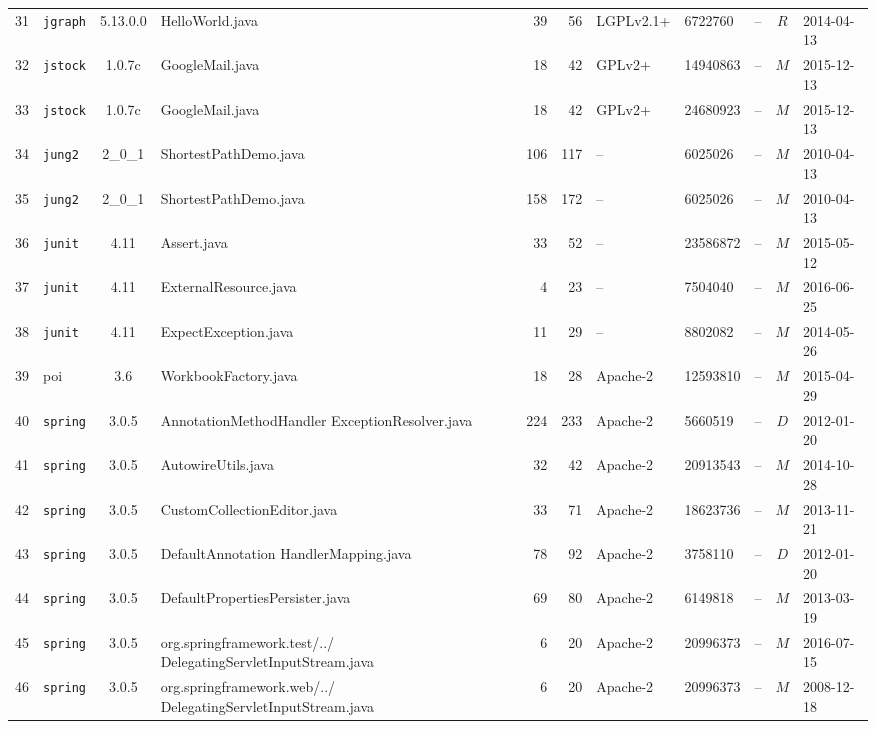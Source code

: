 \documentclass{sig-alternate-05-2015}
\begin{document}
\begin{table}
{\begin{tabular}{r|l|c|p{4.5cm}|r|r|l|l|l|c|l}
			31 & \texttt{jgraph} & 5.13.0.0 & HelloWorld.java  & 39 & 56 & LGPLv2.1+ & 6722760 & -- & $R$  & 2014-04-13 \\
			32 & \texttt{jstock} & 1.0.7c & GoogleMail.java  & 18 & 42 & GPLv2+ & 14940863 & -- & $M$  & 2015-12-13 \\
			33 & \texttt{jstock} & 1.0.7c & GoogleMail.java  & 18 & 42 & GPLv2+ & 24680923 & -- & $M$  & 2015-12-13 \\
			34 & \texttt{jung2} & 2\_0\_1  & ShortestPathDemo.java  & 106 & 117 & -- & 6025026 & -- & $M$  & 2010-04-13 \\
			35 & \texttt{jung2} & 2\_0\_1  & ShortestPathDemo.java  & 158 & 172 & -- & 6025026 & -- & $M$  & 2010-04-13 \\
			36 & \texttt{junit} & 4.11 & Assert.java  & 33 & 52 & -- & 23586872 & -- & $M$  & 2015-05-12 \\
			37 & \texttt{junit} & 4.11 & ExternalResource.java  & 4 & 23 & -- & 7504040 & -- & $M$  & 2016-06-25 \\
			38 & \texttt{junit} & 4.11 & ExpectException.java  & 11 & 29 & -- & 8802082 & -- & $M$  & 2014-05-26 \\
			39 & poi & 3.6 & WorkbookFactory.java  & 18 & 28 & Apache-2 & 12593810 & -- & $M$  & 2015-04-29 \\
			40 & \texttt{spring} & 3.0.5 & AnnotationMethodHandler \newline ExceptionResolver.java  & 224 & 233 & Apache-2 & 5660519 & -- & $D$  & 2012-01-20 \\
			41 & \texttt{spring} & 3.0.5  & AutowireUtils.java  & 32 & 42 & Apache-2 & 20913543 & -- & $M$  & 2014-10-28 \\
			42 & \texttt{spring} & 3.0.5  & CustomCollectionEditor.java  & 33 & 71 & Apache-2 & 18623736 & -- & $M$  & 2013-11-21 \\
			43 & \texttt{spring} & 3.0.5  & DefaultAnnotation \newline HandlerMapping.java  & 78 & 92 & Apache-2 & 3758110 & -- & $D$  & 2012-01-20 \\
			44 & \texttt{spring} & 3.0.5  & DefaultPropertiesPersister.java  & 69 & 80 & Apache-2 & 6149818 & -- & $M$  & 2013-03-19 \\
			45 & \texttt{spring} & 3.0.5  & org.springframework.test/../ \newline DelegatingServletInputStream.java  & 6 & 20 & Apache-2 & 20996373 & -- & $M$  & 2016-07-15 \\
			46 & \texttt{spring} & 3.0.5  & org.springframework.web/../ \newline DelegatingServletInputStream.java  & 6 & 20 & Apache-2 & 20996373 & -- & $M$  & 2008-12-18 \\

\end{tabular}}
\end{table}
\end{document}

